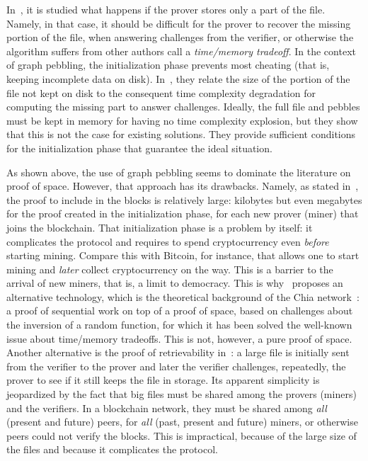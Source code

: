 In~\cite{Reyzin23}, it is studied what happens if the prover stores only a part of the file.
Namely, in that case, it should be difficult for the prover to recover the
missing portion of the file, when answering challenges from the verifier, or otherwise
the algorithm suffers from other authors call a \emph{time/memory tradeoff}.
In the context of graph pebbling, the initialization phase prevents most cheating
(that is, keeping incomplete data on disk). In~\cite{Reyzin23}, they relate the size
of the portion of the file not kept on disk to the consequent time
complexity degradation for computing the missing part to answer challenges.
Ideally, the full file and pebbles must be kept in memory
for having no time complexity explosion, but they show that this is not the case for existing solutions.
They provide sufficient conditions for the initialization phase that guarantee the ideal situation.

As shown above, the use of graph pebbling seems to dominate the literature on proof of space.
However, that approach has its drawbacks.
Namely, as stated in~\cite{AbusalahACKPR17}, the proof to include in the blocks is relatively large:
kilobytes but even megabytes for the proof created in the initialization phase, for each new
prover (miner) that joins the blockchain. That initialization phase is a problem by itself: it complicates
the protocol and requires to spend cryptocurrency even \emph{before}
starting mining. Compare this with Bitcoin, for instance, that allows one to start mining
and \emph{later} collect cryptocurrency on the way. This is a barrier to the arrival of new
miners, that is, a limit to democracy.
This is why~\cite{AbusalahACKPR17} proposes an alternative technology, which is the
theoretical background of the Chia network~\cite{CohenP19,Chia}:
a proof of sequential work on top of a proof of space, based on challenges
about the inversion of a random function, for which it has been solved
the well-known issue about time/memory tradeoffs. This is not, however, a pure proof of space.
Another alternative is the proof of retrievability in~\cite{JuelsK07}: a large file
is initially sent from the verifier to the prover and later the verifier
challenges, repeatedly, the prover to see if it still keeps the file in storage.
Its apparent simplicity
is jeopardized by the fact that big files must be shared among the provers (miners) and
the verifiers. In a blockchain network, they must be shared among \emph{all} (present and future)
peers, for \emph{all} (past, present and future) miners, or otherwise peers could not verify the blocks.
This is impractical, because of the large size of the files and because it complicates the protocol.

